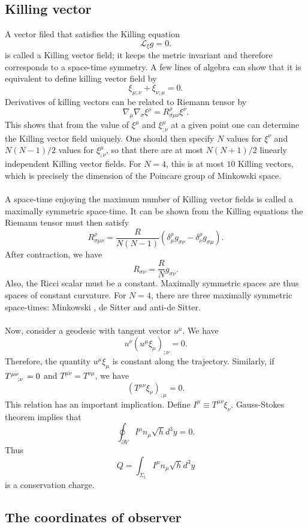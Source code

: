\subsection{Killing vector}
A vector filed that satisfies the Killing equation
\[\mathscr{L}_{\xi}g = 0.\]
is called a Killing vector field; it keeps the metric invariant and therefore corresponds to a space-time symmetry. A few lines of algebra can show that it is equivalent to define killing vector field by
\[\xi_{\mu;\nu} + \xi_{\nu;\mu} = 0.\]
Derivatives of killing vectors can be related to Riemann tensor by
\[\nabla_{\mu} \nabla_{\sigma}\xi^{\rho} = R^{\rho}_{\sigma\mu\nu}\xi^{\nu}.\]
This shows that from the value of $\xi^{\mu}$ and $\xi^{\mu}_{;\nu}$ at a given point one can determine the Killing vector field uniquely. One should then specify $N$ values for $\xi^{\nu}$ and $N(N-1)/2$ values for $\xi^{\mu}_{;\nu}$, so that there are at most $N(N+1)/2$ linearly independent Killing vector fields. For $N=4$,
this is at most $10$ Killing vectors, which is precisely the dimension of the Poincare group of Minkowski space.
\\ \\
A space-time enjoying the maximum number of Killing vector fields is called a maximally symmetric space-time. It can be shown from the Killing equations the Riemann tensor must then satisfy
\[R^{\rho}_{\sigma\mu\nu} = \frac{R}{N(N-1)} (\delta^{\rho}_{\mu}g_{\sigma\nu} - \delta^{\rho}_{\nu}g_{\sigma\mu}).\]
After contraction, we have
\[R_{\sigma\nu} = \frac{R}{N}g_{\sigma\nu}.\]
Also, the Ricci scalar must be a constant. Maximally symmetric spaces are thus spaces of constant curvature. 
For $N =4$, there are three maximally symmetric space-times:
Minkowski , de Sitter and anti-de Sitter.
\\ \\
Now, consider a geodesic with tangent vector $u^{\mu}$. We have
\[u^{\nu}(u^{\mu}\xi_{\mu})_{;\nu} = 0.\]
Therefore, the quantity $u^{\mu}\xi_{\mu}$ is constant along the trajectory.
Similarly, if $\tensor{T}{^{\mu\nu}_{;\nu}} = 0$ and $T^{\mu\nu}=T^{\nu\mu}$, we have
\[(T^{\mu\nu}\xi_{\nu})_{;\mu} = 0.\]
This relation has an important implication. Define $I^{\mu} \equiv T^{\mu\nu}\xi_{\nu}$. Gauss-Stokes theorem implies that
\[\oint_{\partial V} I^{\mu}n_{\mu} \sqrt{h}d^3y = 0.\]
Thus
\[Q = \int_{\Sigma_t} I^{\mu}n_{\mu} \sqrt{h}d^3y\]
is a conservation charge.

\subsection{The coordinates of observer}
